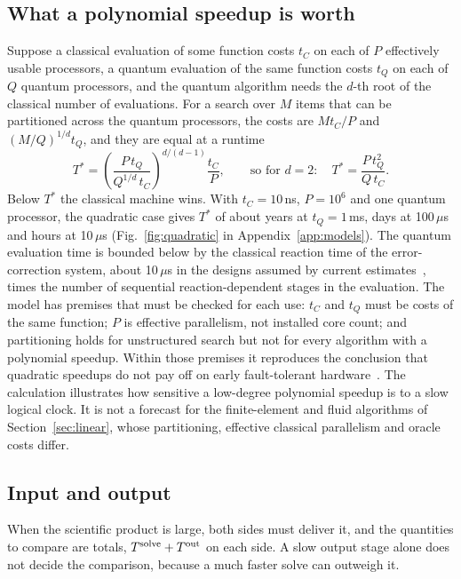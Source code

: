 \subsection{What a polynomial speedup is worth}
\label{sec:breakeven}
Suppose a classical evaluation of some function costs $t_C$ on each of $P$ effectively usable processors, a quantum evaluation of the same function costs $t_Q$ on each of $Q$ quantum processors, and the quantum algorithm needs the $d$-th root of the classical number of evaluations. For a search over $M$ items that can be partitioned across the quantum processors, the costs are $Mt_C/P$ and $(M/Q)^{1/d}t_Q$, and they are equal at a runtime
\begin{equation}
T^*=\left(\frac{P\,t_Q}{Q^{1/d}\,t_C}\right)^{\!d/(d-1)}\frac{t_C}{P},\qquad\text{so for } d=2:\quad T^*=\frac{P\,t_Q^2}{Q\,t_C}.
\label{eq:tstar}
\end{equation}
Below $T^*$ the classical machine wins. With $t_C=10$\,ns, $P=10^6$ and one quantum processor, the quadratic case gives $T^*$ of about \beYms{} years at $t_Q=1$\,ms, \beDhundred{} days at 100\,$\mu$s and \beHten{} hours at 10\,$\mu$s (Fig.~\ref{fig:quadratic} in Appendix~\ref{app:models}). The quantum evaluation time is bounded below by the classical reaction time of the error-correction system, about 10\,$\mu$s in the designs assumed by current estimates~\cite{low2026dense}, times the number of sequential reaction-dependent stages in the evaluation. The model has premises that must be checked for each use: $t_C$ and $t_Q$ must be costs of the same function; $P$ is effective parallelism, not installed core count; and partitioning holds for unstructured search but not for every algorithm with a polynomial speedup. Within those premises it reproduces the conclusion that quadratic speedups do not pay off on early fault-tolerant hardware~\cite{babbush2021,hoefler2023}. The calculation illustrates how sensitive a low-degree polynomial speedup is to a slow logical clock. It is not a forecast for the finite-element and fluid algorithms of Section~\ref{sec:linear}, whose partitioning, effective classical parallelism and oracle costs differ.

\subsection{Input and output}
\label{sec:output}
When the scientific product is large, both sides must deliver it, and the quantities to compare are totals, $T^{\rm solve}+T^{\rm out}$ on each side. A slow output stage alone does not decide the comparison, because a much faster solve can outweigh it.

